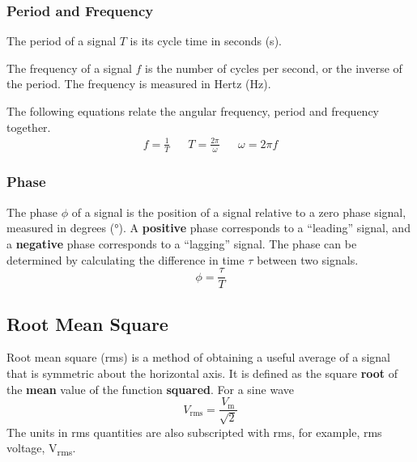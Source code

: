 \documentclass{article}
\begin{document}
\subsubsection{Period and Frequency}
\begin{definition}[Period]
    The period of a signal \(T\) is its cycle time in seconds (\unit{\second}).
\end{definition}
\begin{definition}[Frequency]
    The frequency of a signal \(f\) is the number of cycles per second, or
    the inverse of the period. The frequency is measured in Hertz (\unit{\hertz}).
\end{definition}
The following equations relate the angular frequency, period and frequency together.
\begin{align*}
    f = \frac{1}{T} &  & T = \frac{2\pi}{\omega} &  & \omega = 2 \pi f
\end{align*}
\subsubsection{Phase}
\begin{definition}
    The phase \(\phi\) of a signal is the position of a signal relative to a zero phase signal,
    measured in degrees (\unit{\degree}). A \textbf{positive} phase corresponds to a ``leading''
    signal, and a \textbf{negative} phase corresponds to a ``lagging'' signal.
    The phase can be determined by calculating the difference in time \(\tau\) between two signals.
    \begin{equation*}
        \phi = \frac{\tau}{T}
    \end{equation*}
\end{definition}
\subsection{Root Mean Square}
\begin{definition}
    Root mean square (rms) is a method of obtaining a useful average of a signal that is symmetric about
    the horizontal axis. It is defined as the square \textbf{root} of the \textbf{mean} value of the
    function \textbf{squared}.
    For a sine wave
    \begin{equation*}
        V_{\mathrm{rms}} = \frac{V_{\mathrm{m}}}{\sqrt{2}}
    \end{equation*}
    The units in rms quantities are also subscripted with rms, for example, rms voltage, \unit{V_{rms}}.
\end{definition}
\end{document}
